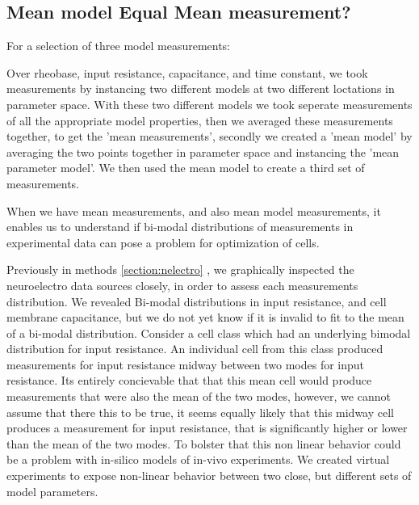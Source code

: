 \subsection{Mean model Equal Mean measurement?}
For a selection of three model measurements:

Over rheobase, input resistance, capacitance, and time constant, we took measurements by instancing two different models at  two different loctations in parameter space. With these two different models we took seperate measurements of all the appropriate model properties, then we averaged these measurements together, to get the 'mean measurements', secondly we created a 'mean model' by averaging the two points together in parameter space and instancing the 'mean parameter model'. We then used the mean model to create a third set of measurements.

When we have mean measurements, and also mean model measurements, it enables us to understand if bi-modal distributions of measurements in experimental data can pose a problem for optimization of cells.

Previously in methods \ref{section:nelectro} , we graphically inspected the neuroelectro data sources closely, in order to assess each measurements distribution. We revealed Bi-modal distributions in input resistance, and cell membrane capacitance, but we do not yet know if it is invalid to fit to the mean of a bi-modal distribution. Consider a  cell class which had an underlying bimodal distribution for input resistance. An individual cell from this class produced measurements for input resistance midway between two modes for input resistance. Its entirely concievable that that this mean cell would produce measurements that were also the mean of the two modes, however, we cannot assume that there this to be true, it seems equally likely that this midway cell produces a measurement for input resistance, that is significantly higher or lower than the mean of the two modes. To bolster that this non linear behavior could be a problem with in-silico models of in-vivo experiments. We created virtual experiments to expose non-linear behavior between two  close, but different sets of model parameters.


